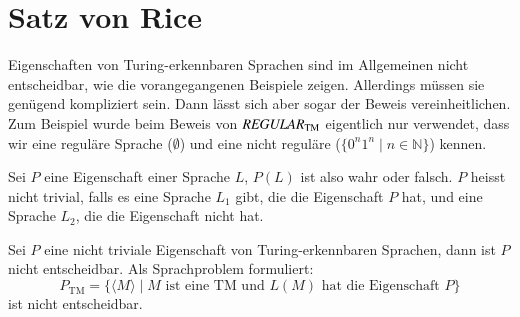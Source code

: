 \section{Satz von Rice}
Eigenschaften von Turing-erkennbaren Sprachen sind im Allgemeinen
nicht entscheidbar, wie die vorangegangenen Beispiele zeigen.
Allerdings müssen sie genü\-gend kompliziert sein.
Dann lässt
sich aber sogar der Beweis vereinheitlichen.
Zum Beispiel wurde
beim Beweis von $\text{\it REGULAR}_{\text{TM}}$ eigentlich
nur verwendet, dass wir eine reguläre Sprache ($\emptyset$) und
eine nicht reguläre ($\{0^n1^n\;|\;n\in\mathbb N\}$) kennen.

\begin{definition}
%
Sei $P$ eine Eigenschaft einer Sprache $L$, $P(L)$ ist also wahr oder
falsch.
$P$ heisst nicht trivial, falls es eine Sprache $L_1$ gibt,
die die Eigenschaft $P$ hat, und eine Sprache $L_2$, die die
Eigenschaft nicht hat.
\end{definition}

\begin{satz}[Rice]
%
\label{rice-theorem}
Sei $P$ eine nicht triviale Eigenschaft von Turing-erkennbaren Sprachen,
dann ist $P$ nicht entscheidbar.
Als Sprachproblem formuliert:
\[
P_{\text{TM}}=\{ \langle M\rangle\;|\;
\text{$M$ ist eine TM und $L(M)$ hat die Eigenschaft $P$}
\}
\]
ist nicht entscheidbar.
\end{satz}

